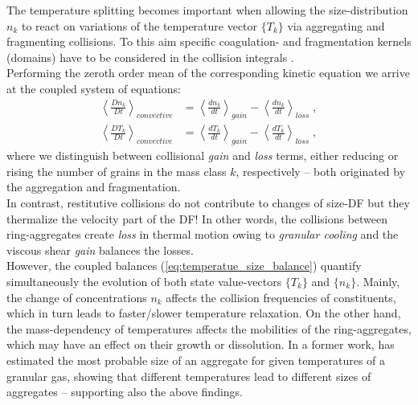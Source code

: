 \documentclass[11pt, notitlepage]{article} %
\begin{document}
The temperature splitting becomes important when allowing the size-distribution $n_k$ to react on variations of the 
temperature vector $\{T_k\}$ via aggregating and fragmenting collisions. To this aim specific coagulation- and fragmentation kernels (domains)
have to be considered in the collision integrals \citep{spahn2004}.\\ 
Performing the zeroth order mean of the corresponding kinetic
equation we arrive at the coupled system of equations:
\begin{equation}
\label{eq:temperatue_size_balance}
	\begin{split}
		\left\langle\frac{D n_k}{Dt}\right\rangle_{convective} &= \left\langle\frac{dn_k}{dt}\right\rangle_{gain}-\left\langle\frac{dn_k}{dt}\right\rangle_{loss}\;,\\
		\left\langle\frac{D T_k}{Dt}\right\rangle_{convective} &= \left\langle\frac{dT_k}{dt}\right\rangle_{gain}-\left\langle\frac{dT_k}{dt}\right\rangle_{loss}\;,
	\end{split}
\end{equation}
where we distinguish between collisional {\em gain} and {\em loss} terms, either reducing or rising the number of grains in the mass class $k$, 
respectively  -- both originated by the aggregation and fragmentation.\\  
In contrast, restitutive collisions do not  contribute to changes of size-DF but they thermalize the velocity part of the DF! In other words, 
the collisions between ring-aggregates create {\em loss} in thermal motion owing to {\em granular cooling} and the viscous shear {\em gain}
balances the losses.\\
However, the coupled balances (\ref{eq:temperatue_size_balance}) quantify simultaneously the evolution of both state value-vectors
$\{T_k\}$ and $\{n_k\}$. Mainly, the change of concentrations $n_k$ affects the collision frequencies of constituents, which in turn leads to 
faster/slower temperature relaxation. On the other hand, the mass-dependency of temperatures affects the mobilities 
of the ring-aggregates, which may have an effect on their growth or dissolution. In a former work, \citet{baibolatov2012} has estimated the 
most probable size of an aggregate for given temperatures of a granular gas, showing that different temperatures lead to different sizes of 
aggregates -- supporting also the above findings.\\\\
\end{document}
